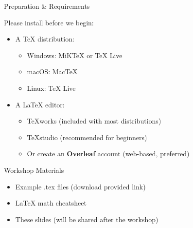 \begin{frame}{Preparation \& Requirements}
	\begin{block}{Please install before we begin:}
		\begin{itemize}
			\item A TeX distribution:
			\begin{itemize}
				\item Windows: MiKTeX or TeX Live
				\item macOS: MacTeX
				\item Linux: TeX Live
			\end{itemize}
			\item A LaTeX editor:
			\begin{itemize}
				\item TeXworks (included with most distributions)
				\item TeXstudio (recommended for beginners)
				\item Or create an \textbf{Overleaf} account (web-based, preferred)
			\end{itemize}
		\end{itemize}
	\end{block}
	
	\begin{alertblock}{Workshop Materials}
		\begin{itemize}
			\item Example .tex files (download provided link)
			\item LaTeX math cheatsheet
			\item These slides (will be shared after the workshop)
		\end{itemize}
	\end{alertblock}
\end{frame}
